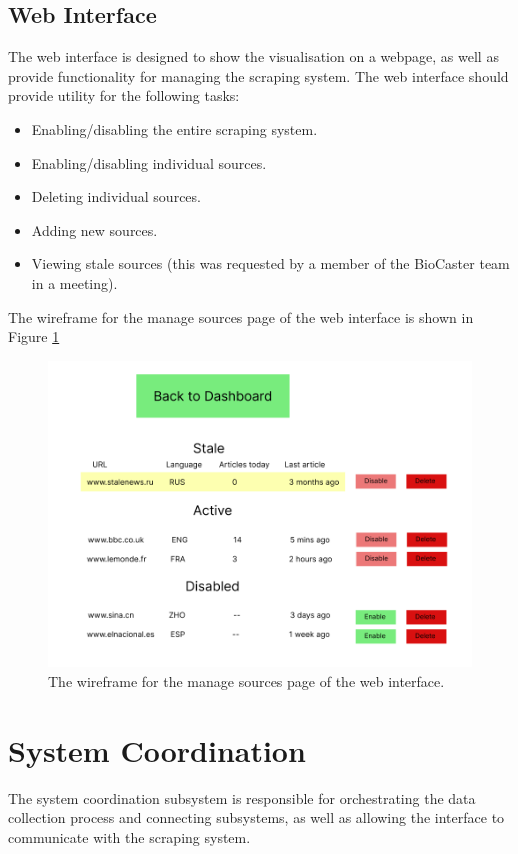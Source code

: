 \documentclass{l4proj}
\begin{document}
\subsection{Web Interface}
The web interface is designed to show the visualisation on a webpage, as well as provide functionality for managing the scraping system. The web interface should provide utility for the following tasks:
\begin{itemize}
    \item Enabling/disabling the entire scraping system.
    \item Enabling/disabling individual sources.
    \item Deleting individual sources.
    \item Adding new sources.
    \item Viewing stale sources (this was requested by a member of the BioCaster team in a meeting).
\end{itemize}
The wireframe for the manage sources page of the web interface is shown in Figure \ref{fig:interface-wireframe} 
 \begin{figure}[h]
\centering
\includegraphics[width=\textwidth]{images/interface-wireframe-sources.png}
\caption{The wireframe for the manage sources page of the web interface.}
\label{fig:interface-wireframe}
\end{figure}

\section{System Coordination}
The system coordination subsystem is responsible for orchestrating the data collection process and connecting subsystems, as well as allowing the interface to communicate with the scraping system.
\end{document}
